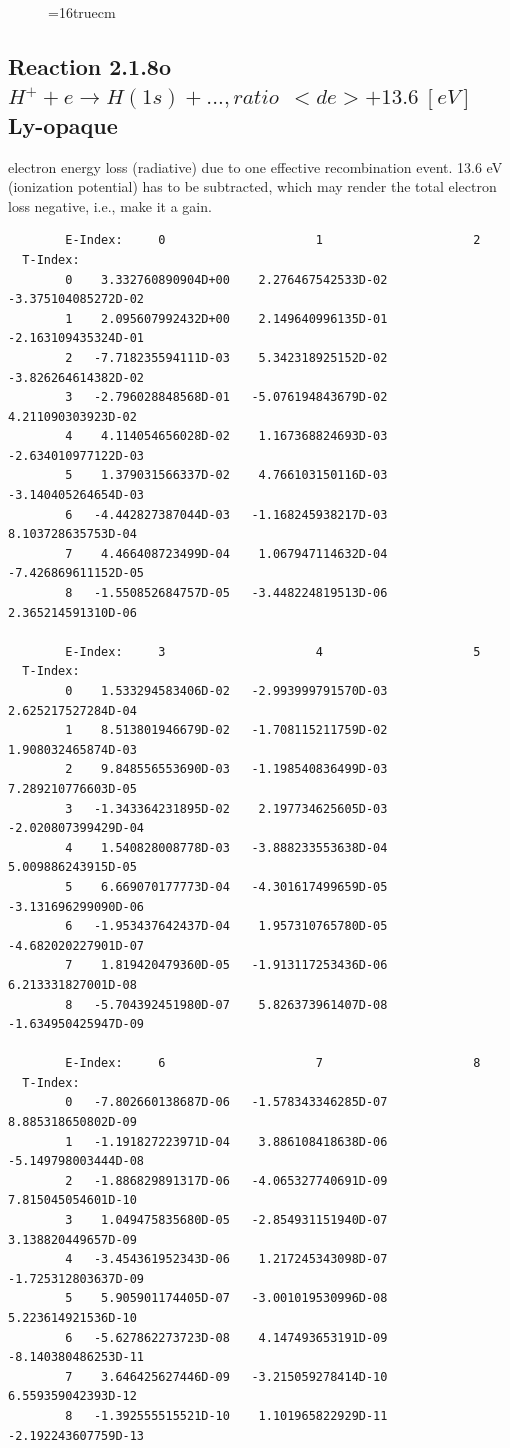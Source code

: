 \documentclass[12pt,dvips]{article}
\begin{document}
\begin{figure} \label{2.1.8lr3}
\epsfxsize=16truecm
\end{figure}
\newpage



\subsection{
  Reaction 2.1.8o $H^+ + e \rightarrow H(1s) + ..., ratio ~ \ <de> + 13.6 \ [eV] $
  Ly-opaque
}

  electron energy loss (radiative) due to one effective recombination event.
  13.6 eV (ionization potential) has to be
  subtracted, which may render the total electron loss negative, i.e., make it a gain.

\begin{small}\begin{verbatim}
        E-Index:     0                     1                     2
  T-Index:
        0    3.332760890904D+00    2.276467542533D-02   -3.375104085272D-02
        1    2.095607992432D+00    2.149640996135D-01   -2.163109435324D-01
        2   -7.718235594111D-03    5.342318925152D-02   -3.826264614382D-02
        3   -2.796028848568D-01   -5.076194843679D-02    4.211090303923D-02
        4    4.114054656028D-02    1.167368824693D-03   -2.634010977122D-03
        5    1.379031566337D-02    4.766103150116D-03   -3.140405264654D-03
        6   -4.442827387044D-03   -1.168245938217D-03    8.103728635753D-04
        7    4.466408723499D-04    1.067947114632D-04   -7.426869611152D-05
        8   -1.550852684757D-05   -3.448224819513D-06    2.365214591310D-06

        E-Index:     3                     4                     5
  T-Index:
        0    1.533294583406D-02   -2.993999791570D-03    2.625217527284D-04
        1    8.513801946679D-02   -1.708115211759D-02    1.908032465874D-03
        2    9.848556553690D-03   -1.198540836499D-03    7.289210776603D-05
        3   -1.343364231895D-02    2.197734625605D-03   -2.020807399429D-04
        4    1.540828008778D-03   -3.888233553638D-04    5.009886243915D-05
        5    6.669070177773D-04   -4.301617499659D-05   -3.131696299090D-06
        6   -1.953437642437D-04    1.957310765780D-05   -4.682020227901D-07
        7    1.819420479360D-05   -1.913117253436D-06    6.213331827001D-08
        8   -5.704392451980D-07    5.826373961407D-08   -1.634950425947D-09

        E-Index:     6                     7                     8
  T-Index:
        0   -7.802660138687D-06   -1.578343346285D-07    8.885318650802D-09
        1   -1.191827223971D-04    3.886108418638D-06   -5.149798003444D-08
        2   -1.886829891317D-06   -4.065327740691D-09    7.815045054601D-10
        3    1.049475835680D-05   -2.854931151940D-07    3.138820449657D-09
        4   -3.454361952343D-06    1.217245343098D-07   -1.725312803637D-09
        5    5.905901174405D-07   -3.001019530996D-08    5.223614921536D-10
        6   -5.627862273723D-08    4.147493653191D-09   -8.140380486253D-11
        7    3.646425627446D-09   -3.215059278414D-10    6.559359042393D-12
        8   -1.392555515521D-10    1.101965822929D-11   -2.192243607759D-13


\end{verbatim}
\end{small}
\end{document}
